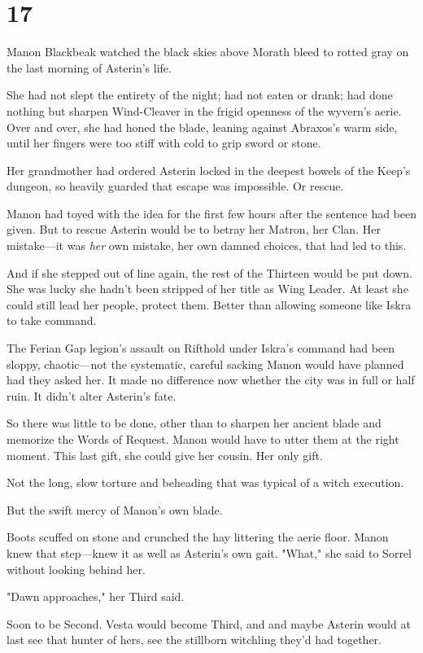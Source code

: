 
\chapter{17}

Manon Blackbeak watched the black skies above Morath bleed to rotted gray on the last morning of Asterin's life.

She had not slept the entirety of the night; had not eaten or drank; had done nothing but sharpen Wind-Cleaver in the frigid openness of the wyvern's aerie. Over and over, she had honed the blade, leaning against Abraxos's warm side, until her fingers were too stiff with cold to grip sword or stone.

Her grandmother had ordered Asterin locked in the deepest bowels of the Keep's dungeon, so heavily guarded that escape was impossible. Or rescue.

Manon had toyed with the idea for the first few hours after the sentence had been given. But to rescue Asterin would be to betray her Matron, her Clan. Her mistake---it was \emph{her} own mistake, her own damned choices, that had led to this.

And if she stepped out of line again, the rest of the Thirteen would be put down. She was lucky she hadn't been stripped of her title as Wing Leader. At least she could still lead her people, protect them. Better than allowing someone like Iskra to take command.

The Ferian Gap legion's assault on Rifthold under Iskra's command had been sloppy, chaotic---not the systematic, careful sacking Manon would have planned had they asked her. It made no difference now whether the city was in full or half ruin. It didn't alter Asterin's fate.

So there was little to be done, other than to sharpen her ancient blade and memorize the Words of Request. Manon would have to utter them at the right moment. This last gift, she could give her cousin. Her only gift.

Not the long, slow torture and beheading that was typical of a witch execution.

But the swift mercy of Manon's own blade.

Boots scuffed on stone and crunched the hay littering the aerie floor. Manon knew that step---knew it as well as Asterin's own gait. "What," she said to Sorrel without looking behind her.

"Dawn approaches," her Third said.

Soon to be Second. Vesta would become Third, and  and maybe Asterin would at last see that hunter of hers, see the stillborn witchling they'd had together.


